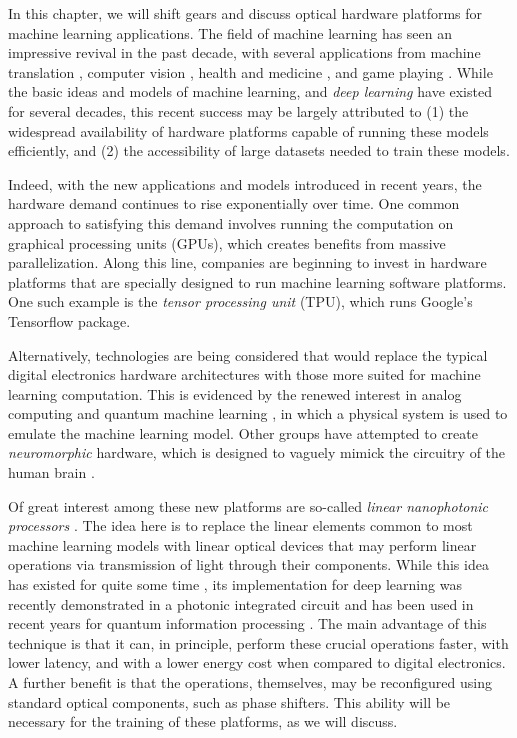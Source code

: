 
In this chapter, we will shift gears and discuss optical hardware platforms for machine learning applications.
The field of machine learning has seen an impressive revival in the past decade, with several applications from machine translation \cite{brown1993mathematics}, computer vision \cite{faugeras1993three}, health and medicine \cite{esteva2017dermatologist}, and game playing \cite{silver2017mastering}.
While the basic ideas and models of machine learning, and \textit{deep learning} \cite{goodfellow2016deep,lecun2015deep} have existed for several decades, this recent success may be largely attributed to (1) the widespread availability of hardware platforms capable of running these models efficiently, and (2) the accessibility of large datasets needed to train these models.

Indeed, with the new applications and models introduced in recent years, the hardware demand continues to rise exponentially over time.
One common approach to satisfying this demand involves running the computation on graphical processing units (GPUs), which creates benefits from massive parallelization.
Along this line, companies are beginning to invest in hardware platforms that are specially designed to run machine learning software platforms.
One such example is the \textit{tensor processing unit} (TPU), which runs Google's Tensorflow package.

Alternatively, technologies are being considered that would replace the typical digital electronics hardware architectures with those more suited for machine learning computation.
This is evidenced by the renewed interest in analog computing and quantum machine learning  \cite{biamonte_quantum_2017}, in which a physical system is used to emulate the machine learning model.
Other groups have attempted to create \textit{neuromorphic} hardware, which is designed to vaguely mimick the circuitry of the human brain \cite{tait_neuromorphic_2017}.

Of great interest among these new platforms are so-called \textit{linear nanophotonic processors} \cite{harris2018linear}.
The idea here is to replace the linear elements common to most machine learning models with linear optical devices that may perform linear operations via transmission of light through their components.
While this idea has existed for quite some time \cite{miller_sorting_2015,Miller2015,Miller2013a,Miller2015,Miller2013a}, its implementation for deep learning was recently demonstrated in a photonic integrated circuit \cite{shen2017deep} and has been used in recent years for quantum information processing \cite{obrien_photonic_2009}.
The main advantage of this technique is that it can, in principle, perform these crucial operations faster, with lower latency, and with a lower energy cost when compared to digital electronics.
A further benefit is that the operations, themselves, may be reconfigured using standard optical components, such as phase shifters.
This ability will be necessary for the training of these platforms, as we will discuss.

